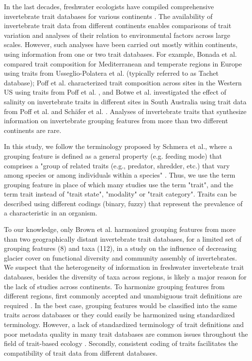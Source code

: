 \documentclass{article}
\begin{document}
In the last decades, freshwater ecologists have compiled comprehensive invertebrate trait databases for various continents \cite{usseglio-polatera_biomonitoring_2000, schmidt-kloiber_www.freshwaterecology.info_2015, vieira_database_nodate, Philips_and_Smith_NZ_DB_2018, kefford_integrated_2020, tomanova_trophic_2006}. The availability of invertebrate trait data from different continents enables comparisons of trait variation and analyses of their relation to environmental factors across large scales. However, such analyses have been carried out mostly within continents, using information from one or two trait databases. For example, Bonada et al. \cite{bonada_taxonomic_2007} compared trait composition for Mediterranean and temperate regions in Europe using traits from Usseglio-Polatera et al. \cite{usseglio-polatera_biomonitoring_2000}(typically referred to as Tachet database); Poff et al. \cite{poff_developing_2010} characterized trait composition across sites in the Western US using traits from Poff et al. \cite{poff_functional_2006}, and Botwe et al. \cite{botwe_effects_2018} investigated the effect of salinity on invertebrate traits in different sites in South Australia using trait data from Poff et al. \cite{poff_functional_2006} and Schäfer et al. \cite{schafer_trait_2011}. Analyses of invertebrate traits that synthesize information on invertebrate grouping features from more than two different continents are rare. 

In this study, we follow the terminology proposed by Schmera et al., where a grouping feature is defined as a general property (e.g. feeding mode) that comprises a "group of related traits (e.g., predator, shredder, etc.) that vary among species or among individuals within a species" \cite{schmera_proposed_2015}. Thus, we use the term grouping feature in place of which many studies use the term "trait", and the term trait instead of "trait state", "modality" or "trait category". Traits can be described using different codings (binary, fuzzy) that represent the prevalence of a characteristic in an organism.

To our knowledge, only Brown et al. \cite{brown_functional_2018} harmonized grouping features from more than two geographically distant invertebrate trait databases, for a limited set of grouping features (8) and taxa (112), in a study on the influence of decreasing glacier cover on functional diversity and community assembly of invertebrates. We suspect that the heterogeneity of information in freshwater invertebrate trait databases, besides the diversity of taxa across regions, is likely a major reason for the lack of studies across continents. To harmonize grouping features from different regions, first commonly accepted and unambiguous trait definitions are required \cite{schneider_towards_2019}. In the best case, grouping features would be classified into the same traits across databases or they could easily be harmonized using standardized terminology. However, a lack of standardized terminology of trait definitions and poor metadata quality in many trait databases are common issues throughout the field of trait-based ecology \cite{baird_toward_2011, schneider_towards_2019}. Secondly, consistent coding of traits facilitates the compatibility of trait data from different databases. 
\end{document}

